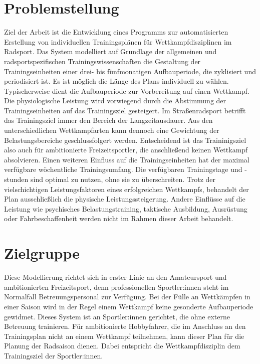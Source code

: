 \section{Problemstellung}
\label{sec:einleitung:problem}
Ziel der Arbeit ist die Entwicklung eines Programms zur automatisierten Erstellung von individuellen Trainingsplänen für Wettkampfdisziplinen im Radsport.
Das System modelliert auf Grundlage der allgemeinen und radsportspezifischen Trainingswissenschaften die Gestaltung der Trainingseinheiten einer drei- bis fünfmonatigen Aufbauperiode, die zyklisiert und periodisiert ist. Es ist möglich die Länge des Plans individuell zu wählen. 
Typischerweise dient die Aufbauperiode zur Vorbereitung auf einen Wettkampf. Die physiologische Leistung wird vorwiegend durch die Abstimmung der Trainingseinheiten auf das Trainingsziel gesteigert. Im Straßenradsport betrifft das Trainingsziel immer den Bereich der Langzeitausdauer. Aus den unterschiedlichen Wettkampfarten kann dennoch eine Gewichtung der Belastungsbereiche geschlussfolgert werden. Entscheidend ist das Traininigsziel also auch für ambitionierte Freizeitsportler, die anschließend keinen Wettkampf absolvieren.\newline
Einen weiteren Einfluss auf die Trainingseinheiten hat der maximal verfügbare wöchentliche Trainingsumfang. Die verfügbaren Trainingstage und -stunden sind optimal zu nutzen, ohne sie zu überschreiten. 
Trotz der vielschichtigen Leistungsfaktoren eines erfolgreichen Wettkampfs, behandelt der Plan ausschließlich die physische Leistungssteigerung. Andere Einflüsse auf die Leistung wie psychisches Belastungstraining, taktische Ausbildung, Ausrüstung oder Fahrbeschaffenheit \cite[13-15]{Radsporttraining} werden nicht im Rahmen dieser Arbeit behandelt.

\section{Zielgruppe}
Diese Modellierung richtet sich in erster Linie an den Amateursport und ambitionierten Freizeitsport, denn professionellen Sportler:innen steht im Normalfall Betreuungspersonal zur Verfügung. Bei der Fülle an Wettkämpfen in einer Saison wird in der Regel einem Wettkampf keine gesonderte Aufbauperiode gewidmet. Dieses System ist an Sportler:innen gerichtet, die ohne externe Betreuung trainieren. Für ambitionierte Hobbyfahrer, die im Anschluss an den Trainingsplan nicht an einem Wettkampf teilnehmen, kann dieser Plan für die Planung der Radsaison dienen. Dabei entspricht die Wettkampfdisziplin dem Trainingsziel der Sportler:innen.

